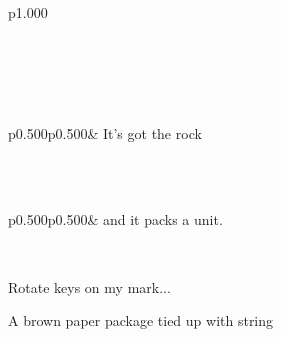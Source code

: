 \label{Ocamlary-module-ExtMod}\begin{ocamlindent}\label{Ocamlary-ExtMod-type-t}\\
\label{Ocamlary-ExtMod-extension-decl-Leisureforce}\\
\begin{ocamltabular}{p{1.000\textwidth}}\label{Ocamlary-ExtMod-extension-Leisureforce}\\
\end{ocamltabular}%
\\
\end{ocamlindent}%
\\
\label{Ocamlary-extension-decl-ZzzTop0}\\
\begin{ocamltabular}{p{0.500\textwidth}p{0.500\textwidth}}\label{Ocamlary-extension-ZzzTop0}& It's got the rock\\
\end{ocamltabular}%
\\
\label{Ocamlary-extension-decl-ZzzTop}\\
\begin{ocamltabular}{p{0.500\textwidth}p{0.500\textwidth}}\label{Ocamlary-extension-ZzzTop}& and it packs a unit.\\
\end{ocamltabular}%
\\
\label{Ocamlary-val-launch_missiles}\begin{ocamlindent}Rotate keys on my mark...\end{ocamlindent}%
\medbreak
\label{Ocamlary-type-my_mod}\begin{ocamlindent}A brown paper package tied up with string\end{ocamlindent}%
